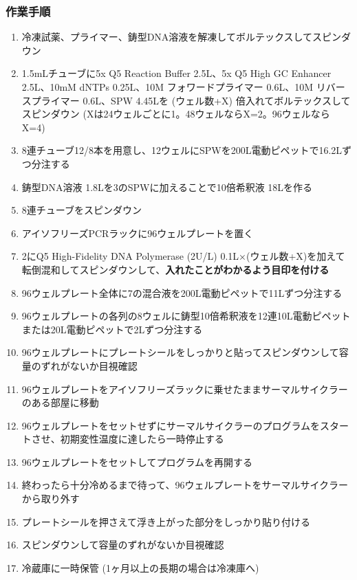 \documentclass[titlepage,10pt,a4paper,uplatex]{jsbook}
\renewcommand{\textbf}[1]{{\bfseries\sffamily#1}}
\begin{document}
\subsubsection{作業手順}
\begin{enumerate}
\item 冷凍試薬、プライマー、鋳型DNA溶液を解凍してボルテックスしてスピンダウン
\item 1.5mLチューブに5x Q5 Reaction Buffer 2.5{\textmu}L、5x Q5 High GC Enhancer 2.5{\textmu}L、10mM dNTPs 0.25{\textmu}L、10{\textmu}M フォワードプライマー 0.6{\textmu}L、10{\textmu}M リバースプライマー 0.6{\textmu}L、SPW 4.45{\textmu}Lを (ウェル数+X) 倍入れてボルテックスしてスピンダウン (Xは24ウェルごとに1。48ウェルならX=2。96ウェルならX=4)
\item 8連チューブ12/8本を用意し、12ウェルにSPWを200{\textmu}L電動ピペットで16.2{\textmu}Lずつ分注する
\item 鋳型DNA溶液 1.8{\textmu}Lを3のSPWに加えることで10倍希釈液 18{\textmu}Lを作る
\item 8連チューブをスピンダウン
\item アイソフリーズPCRラックに96ウェルプレートを置く
\item 2にQ5 High-Fidelity DNA Polymerase (2U/{\textmu}L) 0.1{\textmu}L×(ウェル数+X)を加えて転倒混和してスピンダウンして、\textbf{入れたことがわかるよう目印を付ける}
\item 96ウェルプレート全体に7の混合液を200{\textmu}L電動ピペットで11{\textmu}Lずつ分注する
\item 96ウェルプレートの各列の8ウェルに鋳型10倍希釈液を12連10{\textmu}L電動ピペットまたは20{\textmu}L電動ピペットで2{\textmu}Lずつ分注する
\item 96ウェルプレートにプレートシールをしっかりと貼ってスピンダウンして容量のずれがないか目視確認
\item 96ウェルプレートをアイソフリーズラックに乗せたままサーマルサイクラーのある部屋に移動
\item 96ウェルプレートをセットせずにサーマルサイクラーのプログラムをスタートさせ、初期変性温度に達したら一時停止する
\item 96ウェルプレートをセットしてプログラムを再開する
\item 終わったら十分冷めるまで待って、96ウェルプレートをサーマルサイクラーから取り外す
\item プレートシールを押さえて浮き上がった部分をしっかり貼り付ける
\item スピンダウンして容量のずれがないか目視確認
\item 冷蔵庫に一時保管 (1ヶ月以上の長期の場合は冷凍庫へ)
\end{enumerate}
\end{document}
